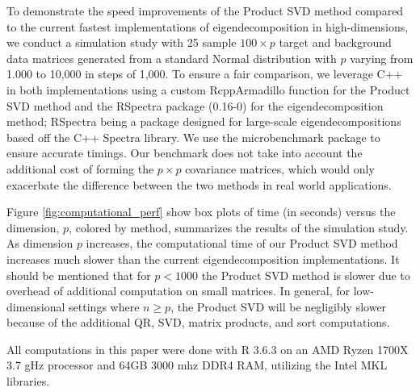 \documentclass[12pt]{article}
\begin{document}
To demonstrate the speed improvements of the Product SVD method compared to the current fastest implementations of eigendecomposition in high-dimensions, we conduct a simulation study with 25 sample $100 \times p$ target and background data matrices generated from a standard Normal distribution with $p$ varying from 1.000 to 10,000 in steps of 1,000. To ensure a fair comparison, we leverage C++ in both implementations using a custom RcppArmadillo \cite{rcpparmadillo} function for the Product SVD method and the RSpectra package (0.16-0) \cite{Rspectra} for the eigendecomposition method; RSpectra being a package designed for large-scale eigendecompositions based off the C++ Spectra library. We use the microbenchmark package \cite{microbenchmark} to ensure accurate timings. Our benchmark does not take into account the additional cost of forming the $p\times p$ covariance matrices, which would only exacerbate the difference between the two methods in real world applications.

Figure \ref{fig:computational_perf} show box plots of time (in seconds) versus the dimension, $p$, colored by method, summarizes the results of the simulation study. As dimension $p$ increases, the computational time of our Product SVD method increases much slower than the current eigendecomposition implementations. It should be mentioned that for $p < 1000$ the Product SVD method is slower due to overhead of additional computation on small matrices. In general, for low-dimensional settings where $n \geq p$, the Product SVD will be negligibly slower because of the additional QR, SVD, matrix products, and sort computations. 


All computations in this paper were done with R 3.6.3 \cite{baseR} on an AMD Ryzen 1700X 3.7 gHz processor and 64GB 3000 mhz DDR4 RAM, utilizing the Intel MKL libraries. 


\end{document}
